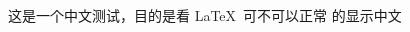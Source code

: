 \documentclass[a4paper,12pt]{article}
\begin{document}
 
\begin{CJK*}{UTF8}{gbsn} %

这是一个中文测试，目的是看 \LaTeX\ 可不可以正常
的显示中文
 
\newpage
\end{CJK*}
\end{document}
